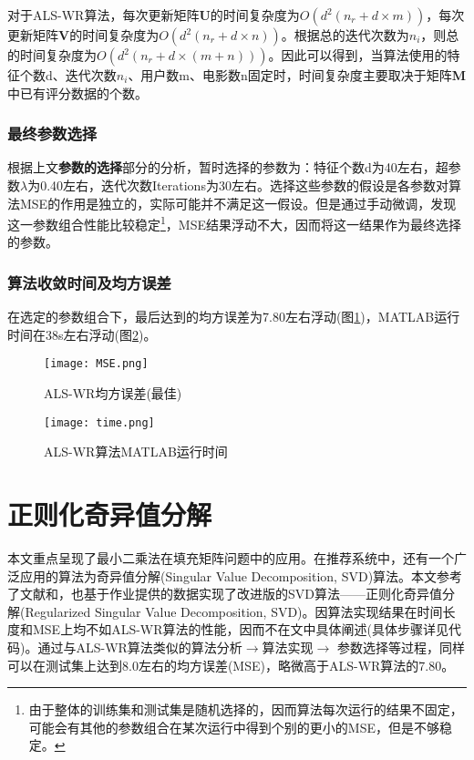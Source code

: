 \documentclass[11pt]{article}
\begin{document}
对于ALS-WR算法，每次更新矩阵\textbf{U}的时间复杂度为$O(d^2(n_r+d\times m))$，每次更新矩阵\textbf{V}的时间复杂度为$O(d^2(n_r + d\times n))$。根据总的迭代次数为$n_i$，则总的时间复杂度为$O(d^2(n_r+d\times(m + n)))$。因此可以得到，当算法使用的特征个数d、迭代次数$n_i$、用户数m、电影数n固定时，时间复杂度主要取决于矩阵\textbf{M}中已有评分数据的个数。

\subsubsection{最终参数选择}

根据上文\textbf{参数的选择}部分的分析，暂时选择的参数为：特征个数d为40左右，超参数$\lambda$为0.40左右，迭代次数Iterations为30左右。选择这些参数的假设是各参数对算法MSE的作用是独立的，实际可能并不满足这一假设。但是通过手动微调，发现这一参数组合性能比较稳定\footnote{由于整体的训练集和测试集是随机选择的，因而算法每次运行的结果不固定，可能会有其他的参数组合在某次运行中得到个别的更小的MSE，但是不够稳定。}，MSE结果浮动不大，因而将这一结果作为最终选择的参数。

\subsubsection{算法收敛时间及均方误差}
在选定的参数组合下，最后达到的均方误差为7.80左右浮动(图\ref{MSE})，MATLAB运行时间在38s左右浮动(图\ref{time})。

\begin{figure}[!htbp]
    \centering
    \texttt{[image: MSE.png]}
    \caption{ALS-WR均方误差(最佳)}
    \label{MSE}
\end{figure}
\begin{figure}[!htbp]
    \centering
    \texttt{[image: time.png]}
    \caption{ALS-WR算法MATLAB运行时间}
    \label{time}
\end{figure}

\section{正则化奇异值分解}
本文重点呈现了最小二乘法在填充矩阵问题中的应用。在推荐系统中，还有一个广泛应用的算法为奇异值分解(Singular Value Decomposition, SVD)算法。本文参考了文献\cite{SVD}和\cite{RSVD}，也基于作业提供的数据实现了改进版的SVD算法——正则化奇异值分解(Regularized Singular Value Decomposition, SVD)。因算法实现结果在时间长度和MSE上均不如ALS-WR算法的性能，因而不在文中具体阐述(具体步骤详见代码)。通过与ALS-WR算法类似的算法分析$\rightarrow$算法实现$\rightarrow$ 参数选择等过程，同样可以在测试集上达到8.0左右的均方误差(MSE)，略微高于ALS-WR算法的7.80。
\end{document}
